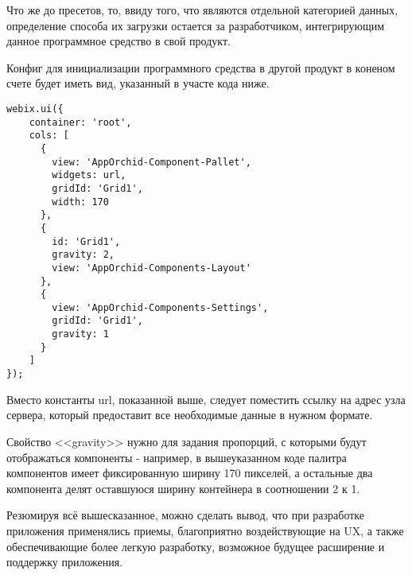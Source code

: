 Что же до пресетов, то, ввиду того, что являются отдельной категорией данных, определение способа их загрузки остается за разработчиком, интегрирующим данное программное средство в свой продукт.

Конфиг для инициализации программного средства в другой продукт в коненом счете будет иметь вид, указанный в участе кода ниже.

\begin{lstlisting}
webix.ui({
	container: 'root',
	cols: [
	  {
	    view: 'AppOrchid-Component-Pallet',
	    widgets: url,
	    gridId: 'Grid1',
	    width: 170
	  },
	  {
	    id: 'Grid1',
	    gravity: 2,
	    view: 'AppOrchid-Components-Layout'
	  },
	  {
	    view: 'AppOrchid-Components-Settings',
	    gridId: 'Grid1',
	    gravity: 1
	  }
	]
});
\end{lstlisting}

Вместо константы url, показанной выше, следует поместить ссылку на адрес узла сервера, который предоставит все необходимые данные в нужном формате.

Свойство <<gravity>> нужно для задания пропорций, с которыми будут отображаться компоненты - например, в вышеуказанном коде палитра компонентов имеет фиксированную ширину 170 пикселей, а остальные два компонента делят оставшуюся ширину контейнера в соотношении 2 к 1.

Резюмируя всё вышесказанное, можно сделать вывод, что при разработке приложения применялись приемы, благоприятно воздействующие на UX, а также обеспечивающие более легкую разработку, возможное будущее расширение и поддержку приложения.